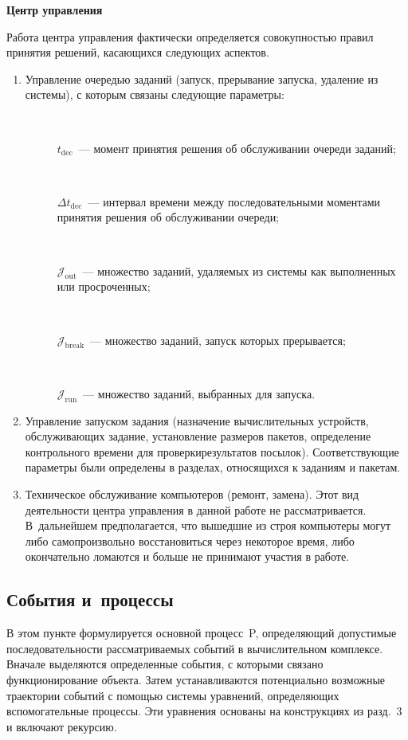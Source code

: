 \begin{multicols}{2}
\smallskip
\textbf{Центр управления}
\smallskip

    Работа центра управления фактически определяется совокупностью 
правил принятия решений, касающихся следующих аспектов.
    \begin{enumerate}[1.]
    \item Управление очередью заданий (запуск, прерывание запуска, 
удаление из системы), с которым связаны следующие параметры:
    \begin{description}
    \item[\,] $t_{\mathrm{dec}}$~--- момент принятия решения об 
обслуживании очереди заданий;
    \item[\,] $\Delta t_{\mathrm{dec}}$~--- интервал времени между 
последовательными моментами принятия решения об обслуживании 
очереди;
    \item[\,] $\mathcal{J}_{\mathrm{out}}$~--- множество заданий, удаляемых из 
сис\-те\-мы как выполненных или просроченных;
    \item[\,] $\mathcal{J}_{\mathrm{break}}$~--- множество заданий, запуск которых 
прерывается;
    \item[\,] $\mathcal{J}_{\mathrm{run}}$~--- множество заданий, выбранных для 
запуска.
    \end{description}
    \item Управление запуском задания (назначение вычислительных 
устройств, обслуживающих задание, установление размеров пакетов, 
определение контрольного времени для проверки\linebreak результатов посылок). 
Соответствующие параметры были определены в разделах, относящихся к 
заданиям и пакетам.
    \item Техническое обслуживание компьютеров (ремонт, замена). Этот 
вид деятельности центра управления в данной работе не рассматривается. 
В~дальнейшем предполагается, что вышедшие из строя компьютеры могут 
либо самопроизвольно восстановиться через некоторое время, либо 
окончательно ломаются и больше не принимают участия в работе.
    \end{enumerate}
    
\subsection{События и~процессы}

    В этом пункте формулируется основной процесс~P, определяющий 
допустимые последовательности рассматриваемых событий в 
вычислительном комплексе. Вначале выделяются определенные события, с 
которыми связано функционирование объекта. Затем устанавливаются 
потенциально возможные траектории событий с помощью системы 
уравнений, определяющих вспомогательные процессы. Эти уравнения 
основаны на конструкциях из разд.~3 и включают рекурсию.
    

\end{multicols}
